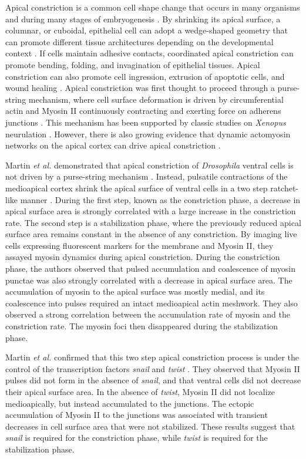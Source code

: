\documentclass{ucetd}
\begin{document}
Apical constriction is a common cell shape change that occurs in many organisms and during many stages of embryogenesis \cite{Sawyer:2010ku}.  By shrinking its apical surface, a columnar, or cuboidal, epithelial cell can adopt a wedge-shaped geometry that can promote different tissue architectures depending on the developmental context \cite{Martin:2014bi}.  If cells maintain adhesive contacts, coordinated apical constriction can promote bending, folding, and invagination of epithelial tissues.  Apical constriction can also promote cell ingression, extrusion of apoptotic cells, and wound healing \cite{Martin:2014bi}.  Apical constriction was first thought to proceed through a purse-string mechanism, where cell surface deformation is driven by circumferential actin and Myosin II continuously contracting and exerting force on adherens junctions \cite{Lecuit:2007cw}.  This mechanism has been supported by classic studies on \textit{Xenopus} neurulation \cite{Martin:2014bi}.  However, there is also growing evidence that dynamic actomyosin networks on the apical cortex can drive apical constriction \cite{Martin:2014bi,Davidson:2012bf}.  

Martin \textit{et al.} demonstrated that apical constriction of \textit{Drosophila} ventral cells is not driven by a purse-string mechanism \cite{Martin:2009du}.  Instead, pulsatile contractions of the medioapical cortex shrink the apical surface of ventral cells in a two step ratchet-like manner \cite{Martin:2009du}.  During the first step, known as the constriction phase, a decrease in apical surface area is strongly correlated with a large increase in the constriction rate.  The second step is a stabilization phase, where the previously reduced apical surface area remains constant in the absence of any constriction.  By imaging live cells expressing fluorescent markers for the membrane and Myosin II, they assayed myosin dynamics during apical constriction.  During the constriction phase, the authors observed that pulsed accumulation and coalescence of myosin punctae was also strongly correlated with a decrease in apical surface area.  The accumulation of myosin to the apical surface was mostly medial, and its coalescence into pulses required an intact medioapical actin meshwork.  They also observed a strong correlation between the accumulation rate of myosin and the constriction rate.  The myosin foci then disappeared during the stabilization phase.  

Martin \textit{et al.} confirmed that this two step apical constriction process is under the control of the transcription factors \textit{snail} and \textit{twist} \cite{Martin:2009du}.  They observed that Myosin II pulses did not form in the absence of \textit{snail}, and that ventral cells did not decrease their apical surface area.  In the absence of \textit{twist},  Myosin II  did not localize medioapically, but instead accumulated to the junctions.  The ectopic accumulation of Myosin II to the junctions was associated with transient decreases in cell surface area that were not stabilized.  These results suggest that \textit{snail} is required for the constriction phase, while \textit{twist} is required for the stabilization phase.
\end{document}
